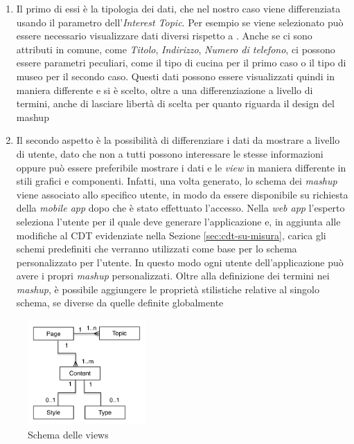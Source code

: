 \begin{enumerate}
	\item
	Il primo di essi è la tipologia dei dati, che nel nostro caso viene differenziata usando il parametro dell'\emph{Interest Topic}.
	Per esempio se viene selezionato  può essere necessario visualizzare dati diversi rispetto a . Anche se ci sono attributi in comune, come \emph{Titolo}, \emph{Indirizzo}, \emph{Numero di telefono}, ci possono essere parametri peculiari, come il tipo di cucina per il primo caso o il tipo di museo per il secondo caso. Questi dati possono essere visualizzati quindi in maniera differente e si è scelto, oltre a una differenziazione a livello di termini, anche di lasciare libertà di scelta per quanto riguarda il design del mashup
	\item
	Il secondo aspetto è la possibilità di differenziare i dati da mostrare a livello di utente, dato che non a tutti possono interessare le stesse informazioni oppure può essere preferibile mostrare i dati e le \emph{view} in maniera differente in stili grafici e componenti. Infatti, una volta generato, lo schema dei \emph{mashup} viene associato allo specifico utente, in modo da essere disponibile su richiesta della \emph{mobile app} dopo che è stato effettuato l'accesso.
	Nella \emph{web app} l'esperto seleziona l'utente per il quale deve generare l'applicazione e, in aggiunta alle modifiche al CDT evidenziate nella Sezione \ref{sec:cdt-su-misura}, carica gli schemi predefiniti che verranno utilizzati come base per lo schema personalizzato per l'utente. In questo modo ogni utente dell'applicazione può avere i propri \emph{mashup} personalizzati.
	Oltre alla definizione dei termini nei \emph{mashup}, è possibile aggiungere le proprietà stilistiche relative al singolo schema, se diverse da quelle definite globalmente
\end{enumerate}

\begin{figure}[ht]
	\centering
	\includegraphics[width=0.4\textwidth]{3-metodologia-camus/Immagini/view-schema.png}
	\caption{Schema delle views}\label{fig:view-schema}
\end{figure}

